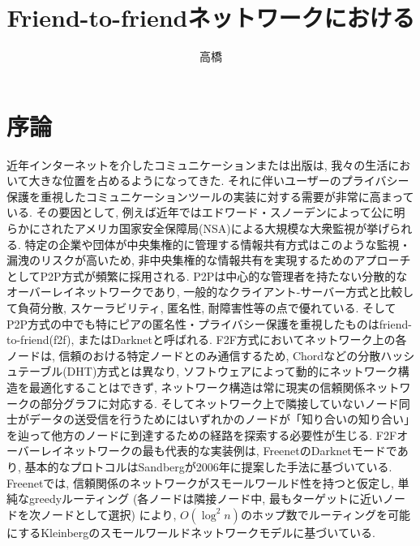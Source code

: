 \documentclass[dvipdfmx]{ampbt}
\title{Friend-to-friendネットワークにおける} %
      {効率的な分散ルーティング}                         %
      {}                                         %
\author{高橋}{彰}             %
\begin{document}
\ifoutputbody
\makeinsidecover                %
\makeabstract                   %
\maketoc                        %
\setcounter{page}{1}            %
\section{序論}
近年インターネットを介したコミュニケーションまたは出版は, 我々の生活において大きな位置を占めるようになってきた. それに伴いユーザーのプライバシー保護を重視したコミュニケーションツールの実装に対する需要が非常に高まっている. その要因として, 例えば近年ではエドワード・スノーデンによって公に明らかにされたアメリカ国家安全保障局(NSA)による大規模な大衆監視が挙げられる. \newline
特定の企業や団体が中央集権的に管理する情報共有方式はこのような監視・漏洩のリスクが高いため, 非中央集権的な情報共有を実現するためのアプローチとしてP2P方式が頻繁に採用される. P2Pは中心的な管理者を持たない分散的なオーバーレイネットワークであり, 一般的なクライアント-サーバー方式と比較して負荷分散, スケーラビリティ, 匿名性, 耐障害性等の点で優れている\cite{lua2005survey}. そしてP2P方式の中でも特にピアの匿名性・プライバシー保護を重視したものはfriend-to-friend(\acrshort{f2f})\cite{bricklin2000friend}, またはDarknet\cite{clarke2010private}と呼ばれる. F2F方式においてネットワーク上の各ノードは, 信頼のおける特定ノードとのみ通信するため, Chord\cite{stoica2001chord}などの分散ハッシュテーブル(DHT)方式とは異なり, ソフトウェアによって動的にネットワーク構造を最適化することはできず, ネットワーク構造は常に現実の信頼関係ネットワークの部分グラフに対応する. そしてネットワーク上で隣接していないノード同士がデータの送受信を行うためにはいずれかのノードが「知り合いの知り合い」を辿って他方のノードに到達するための経路を探索する必要性が生じる\cite{roos2016dealing}.\newline
F2Fオーバーレイネットワークの最も代表的な実装例は, Freenet\cite{clarke2001freenet}のDarknetモード\cite{clarke2010private}であり, 基本的なプロトコルはSandberg\cite{sandberg2006distributed}が2006年に提案した手法に基づいている. Freenetでは, 信頼関係のネットワークがスモールワールド性を持つと仮定し, 単純なgreedyルーティング (各ノードは隣接ノード中, 最もターゲットに近いノードを次ノードとして選択) により, $O(\log^2 n)$のホップ数でルーティングを可能にするKleinbergのスモールワールドネットワークモデル\cite{kleinberg2000small}に基づいている. \newline
\end{document}
